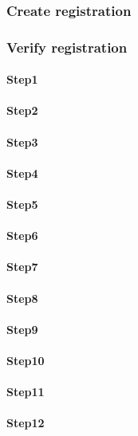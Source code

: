 \documentclass[a4paper, 11pt]{scrartcl}
\begin{document}
\subsubsection{Create registration}

\subsubsection{Verify registration}

\paragraph{Step1}
\paragraph{Step2}
\paragraph{Step3}
\paragraph{Step4}
\paragraph{Step5}
\paragraph{Step6}
\paragraph{Step7}
\paragraph{Step8}
\paragraph{Step9}
\paragraph{Step10}
\paragraph{Step11}
\paragraph{Step12}
\end{document}
